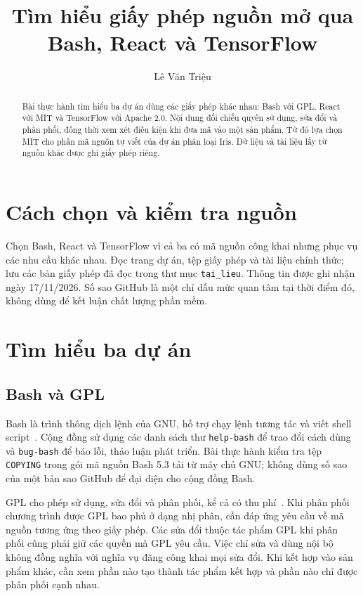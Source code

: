 \documentclass[runningheads]{llncs}
\begin{document}
\title{Tìm hiểu giấy phép nguồn mở qua Bash, React và TensorFlow}
\author{Lê Văn Triệu}
\maketitle
\begin{abstract}
Bài thực hành tìm hiểu ba dự án dùng các giấy phép khác nhau: Bash với GPL, React với MIT và TensorFlow với Apache 2.0. Nội dung đối chiếu quyền sử dụng, sửa đổi và phân phối, đồng thời xem xét điều kiện khi đưa mã vào một sản phẩm. Từ đó lựa chọn MIT cho phần mã nguồn tự viết của dự án phân loại Iris. Dữ liệu và tài liệu lấy từ nguồn khác được ghi giấy phép riêng.
\end{abstract}

\section{Cách chọn và kiểm tra nguồn}
Chọn Bash, React và TensorFlow vì cả ba có mã nguồn công khai nhưng phục vụ các nhu cầu khác nhau. Đọc trang dự án, tệp giấy phép và tài liệu chính thức; lưu các bản giấy phép đã đọc trong thư mục \texttt{tai\_lieu}. Thông tin được ghi nhận ngày 17/11/2026. Số sao GitHub là một chỉ dấu mức quan tâm tại thời điểm đó, không dùng để kết luận chất lượng phần mềm.

\section{Tìm hiểu ba dự án}
\subsection{Bash và GPL}
Bash là trình thông dịch lệnh của GNU, hỗ trợ chạy lệnh tương tác và viết shell script~\cite{bash}. Cộng đồng sử dụng các danh sách thư \texttt{help-bash} để trao đổi cách dùng và \texttt{bug-bash} để báo lỗi, thảo luận phát triển. Bài thực hành kiểm tra tệp \texttt{COPYING} trong gói mã nguồn Bash 5.3 tải từ máy chủ GNU; không dùng số sao của một bản sao GitHub để đại diện cho cộng đồng Bash.

GPL cho phép sử dụng, sửa đổi và phân phối, kể cả có thu phí~\cite{gpl}. Khi phân phối chương trình được GPL bao phủ ở dạng nhị phân, cần đáp ứng yêu cầu về mã nguồn tương ứng theo giấy phép. Các sửa đổi thuộc tác phẩm GPL khi phân phối cũng phải giữ các quyền mà GPL yêu cầu. Việc chỉ sửa và dùng nội bộ không đồng nghĩa với nghĩa vụ đăng công khai mọi sửa đổi. Khi kết hợp vào sản phẩm khác, cần xem phần nào tạo thành tác phẩm kết hợp và phần nào chỉ được phân phối cạnh nhau.
\end{document}
